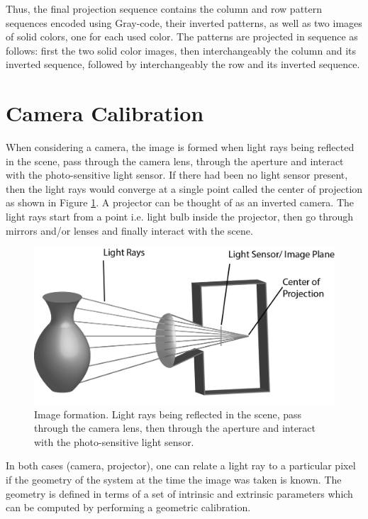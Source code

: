 \documentclass[final,12pt,3p]{elsarticle}
\begin{document}
Thus, the final projection sequence contains the column and row pattern sequences encoded using Gray-code, their inverted patterns, as well as two images of solid colors, one for each used color. The patterns are projected in sequence as follows: first the two solid color images, then interchangeably the column and its inverted sequence, followed by interchangeably the row and its inverted sequence.

\section{Camera Calibration}
\label{sec:calib}

When considering a camera, the image is formed when light rays being reflected in the scene, pass through the camera lens, through the aperture and interact with the photo-sensitive light sensor. If there had been no light sensor present, then the light rays would converge at a single point called the center of projection as shown in Figure \ref{fig:camRays}. A projector can be thought of as an inverted camera. The light rays start from a point i.e. light bulb inside the projector, then go through mirrors and/or lenses and finally interact with the scene.

\begin{figure}[!ht]
	\centering
	\includegraphics[scale=0.8]{./rays_and_camera.png}
	\caption{\label{fig:camRays} Image formation. Light rays being reflected in the scene, pass through the camera lens, then through the aperture and interact with the photo-sensitive light sensor.}
\end{figure}

In both cases (camera, projector), one can relate a light ray to a particular pixel if the geometry of the system at the time the image was taken is known. The geometry is defined in terms of a set of intrinsic and extrinsic parameters which can be computed by performing a geometric calibration.
\end{document}
